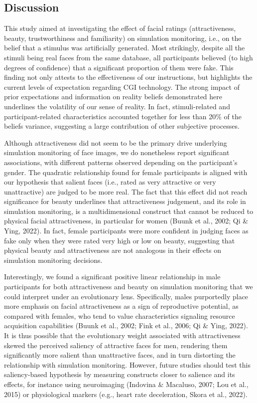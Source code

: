 \documentclass[
  man,floatsintext]{apa6}
\begin{document}
\hypertarget{discussion}{%
\subsection{Discussion}\label{discussion}}

This study aimed at investigating the effect of facial ratings (attractiveness, beauty, trustworthiness and familiarity) on simulation monitoring, i.e., on the belief that a stimulus was artificially generated. Most strikingly, despite all the stimuli being real faces from the same database, all participants believed (to high degrees of confidence) that a significant proportion of them were fake. This finding not only attests to the effectiveness of our instructions, but highlights the current levels of expectation regarding CGI technology. The strong impact of prior expectations and information on reality beliefs demonstrated here underlines the volatility of our sense of reality. In fact, stimuli-related and participant-related characteristics accounted together for less than 20\% of the beliefs variance, suggesting a large contribution of other subjective processes.

Although attractiveness did not seem to be the primary drive underlying simulation monitoring of face images, we do nonetheless report significant associations, with different patterns observed depending on the participant's gender. The quadratic relationship found for female participants is aligned with our hypothesis that salient faces (i.e., rated as very attractive or very unattractive) are judged to be more real. The fact that this effect did not reach significance for beauty underlines that attractiveness judgement, and its role in simulation monitoring, is a multidimensional construct that cannot be reduced to physical facial attractiveness, in particular for women (Buunk et al., 2002; Qi \& Ying, 2022). In fact, female participants were more confident in judging faces as fake only when they were rated very high or low on beauty, suggesting that physical beauty and attractiveness are not analogous in their effects on simulation monitoring decisions.

Interestingly, we found a significant positive linear relationship in male participants for both attractiveness and beauty on simulation monitoring that we could interpret under an evolutionary lens. Specifically, males purportedly place more emphasis on facial attractiveness as a sign of reproductive potential, as compared with females, who tend to value characteristics signaling resource acquisition capabilities (Buunk et al., 2002; Fink et al., 2006; Qi \& Ying, 2022). It is thus possible that the evolutionary weight associated with attractiveness skewed the perceived saliency of attractive faces for men, rendering them significantly more salient than unattractive faces, and in turn distorting the relationship with simulation monitoring. However, future studies should test this saliency-based hypothesis by measuring constructs closer to salience and its effects, for instance using neuroimaging (Indovina \& Macaluso, 2007; Lou et al., 2015) or physiological markers
(e.g., heart rate deceleration, Skora et al., 2022).
\end{document}
